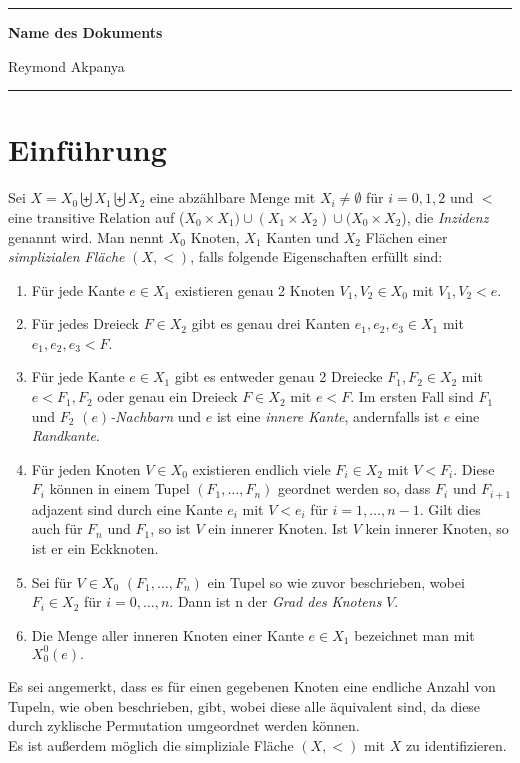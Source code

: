 \documentclass[12pt,titlepage]{article}
\begin{document}
\thispagestyle{empty}
\noindent\rule{\textwidth}{0.5pt}
\centerline{\textbf{\large{Name des Dokuments}}}
\centerline{Reymond Akpanya}
\noindent\rule{\textwidth}{0.5pt}
\newline
\section*{Einführung}
\begin{definition}  \label{defss} Sei $X=X_{0} \biguplus X_{1} \biguplus X_{2}$ eine abzählbare Menge mit $X_{i} \ne \emptyset$ für $i=0,1,2$ und $<$ eine transitive Relation auf  ($X_{0}\times X_{1}) \cup (X_{1}\times X_{2})\cup (X_{0}\times X_{2}$), die \emph{Inzidenz} genannt wird. Man nennt $X_{0}$ Knoten, $X_{1}$ Kanten und $X_{2}$ Flächen einer \emph{simplizialen Fläche} $(X,<)$, falls folgende Eigenschaften erfüllt sind:
 \begin{enumerate}
\item Für jede Kante $e \in X_{1}$ existieren genau 2 Knoten $V_1,V_2 \in X_{0}$ mit $V_1,V_2 < e$. 
\item Für jedes Dreieck $F\in X_2$ gibt es genau drei Kanten $e_1,e_2,e_3 \in X_{1}$ mit $e_1,e_2,e_3 < F$. 
\item Für jede Kante $e \in X_{1}$ gibt es entweder genau 2 Dreiecke $F_{1},F_{2} \in X_{2}$ mit $e <F_{1},F_2$ oder
genau ein Dreieck $F \in X_{2}$ mit $e < F$. Im ersten Fall sind $F_{1}$ und $F_{2}$ \emph{$(e)$-Nachbarn} und $e$ ist eine \emph{innere Kante}, andernfalls ist $e$ eine \emph{Randkante}. 
\item Für jeden Knoten $V \in X_{0}$ existieren endlich viele $F_{i}\in X_{2}$ mit $V < F_{i}$. Diese $F_{i}$ können in einem Tupel $(F_{1},\ldots,F_{n})$ geordnet werden so, dass $F_{i}$ und $F_{i+1}$ adjazent sind durch eine Kante $e_{i}$ mit $V <e_{i}$ für $i=1, \ldots, n-1$. Gilt dies auch für $F_{n}$ und $F_{1}$, so ist $V$ ein innerer Knoten. Ist $V$ kein innerer Knoten, so ist er 
 ein Eckknoten. 
 \item Sei für $V \in X_0$ $(F_1,\ldots,F_n)$ ein Tupel so wie zuvor beschrieben, wobei $F_i \in X_2$ für $i=0,\ldots,n$. Dann ist n der \emph{Grad des Knotens} $V$.
 \item Die Menge aller inneren Knoten einer Kante $e \in X_1$ bezeichnet man mit $X_0^0(e).$
\end{enumerate}
\end{definition}
Es sei angemerkt, dass es für einen gegebenen Knoten eine endliche Anzahl von Tupeln, wie oben beschrieben, gibt, wobei diese alle äquivalent sind, da diese durch zyklische Permutation umgeordnet werden können.\\ Es ist außerdem möglich die simpliziale Fläche $(X,<)$ mit $X$ zu identifizieren.
\end{document}
